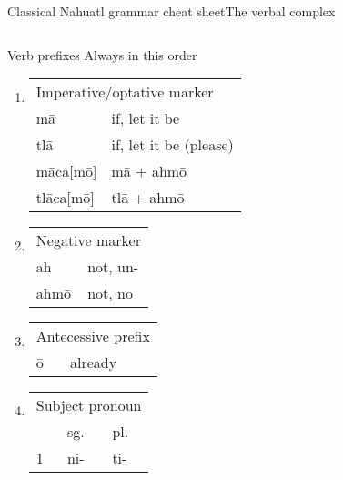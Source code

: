 \documentclass[12pt]{beamer}
\newcommand{\nah}[1]{\textcolor{nahgrn}{#1}}
\newcommand{\trs}[1]{\textcolor{nahblu}{#1}}
\begin{document}
\begin{frame}%
  {Classical Nahuatl grammar cheat sheet}{The verbal complex}
  \begin{columns}[t]
    \begin{column}{0.18\linewidth}
      \begin{block}{Verb prefixes}
        Always in this order
        \begin{enumerate}
          \item
                \begin{tabular}[t]{ll}
                  \multicolumn{2}{l}{Imperative/optative marker} \\
                  \nah{mā}        & \trs{if, let it be}          \\
                  \nah{tlā}       & \trs{if, let it be (please)} \\
                  \nah{māca[mō]}  & \nah{mā + ahmō}              \\
                  \nah{tlāca[mō]} & \nah{tlā + ahmō}             \\
                \end{tabular}
          \item
                \begin{tabular}[t]{ll}
                  \multicolumn{2}{l}{Negative marker} \\
                  \nah{ah}   & \trs{not, un-}         \\
                  \nah{ahmō} & \trs{not, no}          \\
                \end{tabular}
          \item
                \begin{tabular}[t]{ll}
                  \multicolumn{2}{l}{Antecessive prefix} \\
                  \nah{ō} & \trs{already}                \\
                \end{tabular}
          \item
                \begin{threeparttable}
                  \begin{tabular}[t]{lll}
                    \multicolumn{3}{l}{Subject pronoun}             \\
                      & sg.                & pl.                    \\
                    1 & \nah{ni-}          & \nah{ti-}              \\

\end{tabular}
\end{threeparttable}
\end{enumerate}
\end{block}
\end{column}
\end{columns}
\end{frame}
\end{document}
